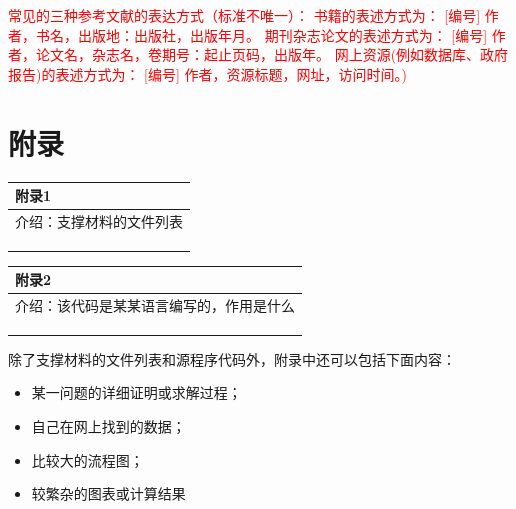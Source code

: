 \documentclass{my_paper}
\begin{document}
\textcolor{red}{常见的三种参考文献的表达方式（标准不唯一）：
书籍的表述方式为： [编号] 作者，书名，出版地：出版社，出版年月。
期刊杂志论文的表述方式为： [编号] 作者，论文名，杂志名，卷期号：起止页码，出版年。
网上资源(例如数据库、政府报告)的表述方式为： [编号] 作者，资源标题，网址，访问时间。)}
\newpage
\section{附录}

\begin{table}[htbp]
    \centering
    \begin{tabular}{|p{14.0cm}|}
    \hline
    \textbf{附录1} \\ %
    \hline
    介绍：支撑材料的文件列表  \\ 
    \\
    \\
    \\
    \hline
    \end{tabular}
\end{table}

\begin{table}[htbp]
    \centering
    \begin{tabular}{|p{14.0cm}|}
    \hline
    \textbf{附录2} \\ %
    \hline
    介绍：该代码是某某语言编写的，作用是什么   \\ 
    \\
    \\
    \\
    \hline
    \end{tabular}
\end{table}

除了支撑材料的文件列表和源程序代码外，附录中还可以包括下面内容：
\begin{itemize}
\item 某一问题的详细证明或求解过程；
\item 自己在网上找到的数据；
\item 比较大的流程图；
\item 较繁杂的图表或计算结果
\end{itemize}
\end{document}
